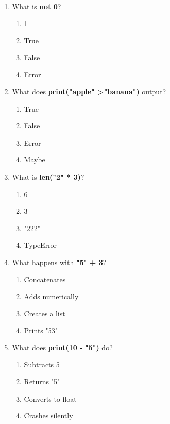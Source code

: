 \documentclass{article}
\begin{document}
\begin{multicols*}{4}
\begin{enumerate}
        \item What is \textbf{not 0}?
        \begin{enumerate}[label=(\Alph*)]
            \item 1
            \item True
            \item False
            \item Error
        \end{enumerate}

        \item What does \textbf{print("apple" \textgreater "banana")} output?
        \begin{enumerate}[label=(\Alph*)]
            \item True
            \item False
            \item Error
            \item Maybe
        \end{enumerate}

        \item What is \textbf{len("2" * 3)}?
        \begin{enumerate}[label=(\Alph*)]
            \item 6
            \item 3
            \item "222"
            \item TypeError
        \end{enumerate}
        \item What happens with \textbf{"5" + 3}?
        \begin{enumerate}[label=(\Alph*)]
            \item Concatenates
            \item Adds numerically
            \item Creates a list
            \item Prints "53"
        \end{enumerate}

        \item What does \textbf{print(10 - "5")} do?
        \begin{enumerate}[label=(\Alph*)]
            \item Subtracts 5
            \item Returns "5"
            \item Converts to float
            \item Crashes silently
        \end{enumerate}


\end{enumerate}
\end{multicols*}
\end{document}
